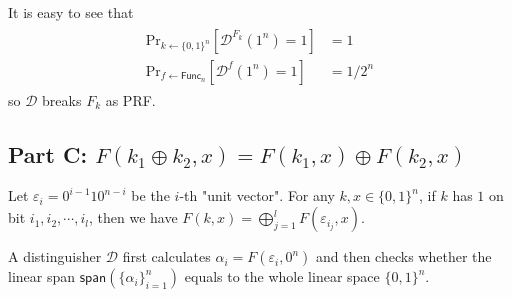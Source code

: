 \documentclass[8pt]{article}
\theoremstyle{compact}
\begin{document}
It is easy to see that \begin{align*}
	\begin{split}
		\text{Pr}_{k \gets \{0, 1\}^n}\left[\mathcal D^{F_k}(1^n) = 1\right] &= 1 \\
		\text{Pr}_{f \gets \textsf{Func}_n}\left[\mathcal D^{f}(1^n) = 1\right] &= 1 / 2^n
	\end{split}
\end{align*}
so $\mathcal D$ breaks $F_k$ as PRF.

\subsection*{Part C: $F(k_1 \oplus k_2, x) = F(k_1, x) \oplus F(k_2, x)$}

Let $\varepsilon_i = 0^{i-1}10^{n-i}$ be the $i$-th "unit vector". For any $k, x \in \{0, 1\}^n$, if $k$ has $1$ on bit $i_1, i_2, \cdots, i_l$, then we have $F(k, x) = \bigoplus\limits_{j=1}^{l}F(\varepsilon_{i_j}, x)$.

A distinguisher $\mathcal D$ first calculates $\alpha_i = F(\varepsilon_i, 0^n)$ and then checks whether the linear span $\textsf{span}\left(\{\alpha_i\}_{i=1}^n\right)$ equals to the whole linear space $\{0, 1\}^n$.
\end{document}
